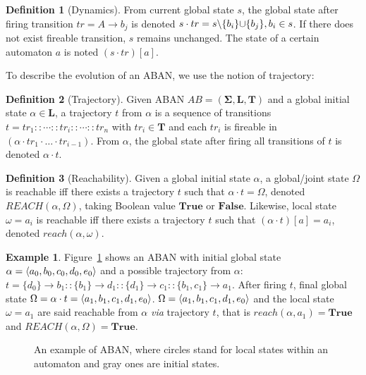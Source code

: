 \documentclass{article}
\newcommand{\acm}[3]{\{#1\}\rightarrow#3}
\theoremstyle{definition}
\newtheorem{definition}{Definition}
\newtheorem{example}{Example}
\DeclarePairedDelimiter{\addset}{\cup\{}{\}}
\DeclarePairedDelimiter{\miset}{\setminus\{}{\}}
\DeclarePairedDelimiter{\init}{\langle}{\rangle}
\begin{document}
\begin{definition}[Dynamics]\label{def:ABANdynamics}
    From current global state $s$, the global state after firing transition $tr=A\to b_j$ is denoted $s \cdot tr = s \miset{b_i} \addset {b_j}, b_i \in s$.
    If there does not exist fireable transition, $s$ remains unchanged.
    The state of a certain automaton $a$ is noted $(s\cdot tr)[a]$.
\end{definition}
To describe the evolution of an ABAN, we use the notion of trajectory:
\begin{definition}[Trajectory]
Given ABAN $AB = (\mathbf{\Sigma},\mathbf{L},\mathbf{T})$ and a global initial state $\alpha\in \mathbf{L}$, a trajectory $t$ from $\alpha$ is a sequence of transitions $t=tr_1::\cdots :: tr_i::\cdots ::tr_n$ with $tr_i\in\mathbf{T}$ and each $tr_i$ is fireable in $(\alpha \cdot tr_1 \cdot \ldots \cdot tr_{i-1})$.
From $\alpha$, the global state after firing all transitions of $t$ is denoted $\alpha \cdot t$.
\end{definition}

\begin{definition}[Reachability]
Given a global initial state $\alpha$, a global/joint state $\Omega$ is reachable iff there exists a trajectory $t$ such that $\alpha\cdot t=\Omega$, denoted $REACH(\alpha, \Omega)$, taking Boolean value $\mathbf{True}$ or $\mathbf{False}$.
Likewise, local state $\omega=a_i$ is reachable iff there exists a trajectory $t$ such that $(\alpha\cdot t)[a]=a_i$, denoted $reach(\alpha, \omega)$.
\end{definition}
\begin{example}\label{example:aban}
Figure~\ref{fig:1} shows an ABAN with initial global state $\alpha=\init{ a_0,b_0,c_0,d_0,e_0}$ and a possible trajectory from $\alpha$: $t=\acm{d_0}{b_0}{b_1}::\acm{b_1}{d_0}{d_1}::\acm{d_1}{c_0}{c_1}::\acm{b_1,c_1}{a_0}{a_1}$. After firing $t$, final global state $\Omega=\alpha\cdot t=\init{a_1,b_1,c_1,d_1,e_0}$.
$\Omega=\init{ a_1,b_1,c_1,d_1,e_0}$ and the local state $\omega=a_1$ are said reachable from $\alpha$ \textit{via} trajectory $t$, that is $reach(\alpha,a_1)=\mathbf{True}$ and $REACH(\alpha,\Omega)=\mathbf{True}$.
\end{example}
\begin{figure}[ht]
\centering

\caption{An example of ABAN, where circles stand for local states within an automaton and gray ones are initial states.}\label{fig:1}
\end{figure}	
\end{document}

